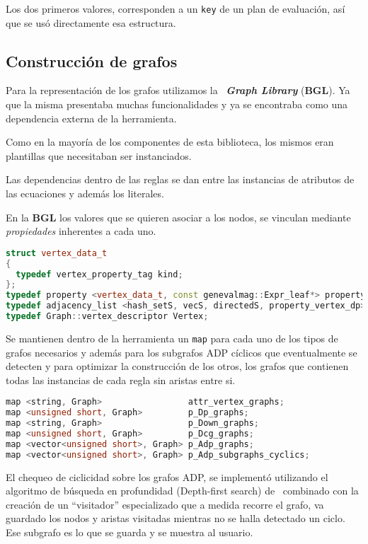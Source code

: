 Los dos primeros valores, corresponden a un \texttt{key} de un plan de evaluación, así que se usó directamente esa estructura.

\subsection{Construcción de grafos}

Para la representación de los grafos utilizamos la \boost\ \textit{\textbf{Graph Library}} (\textbf{BGL}). Ya que la misma presentaba muchas funcionalidades y ya se encontraba como una dependencia externa de la herramienta.

Como en la mayoría de los componentes de esta biblioteca, los mismos eran plantillas que necesitaban ser instanciados.

Las dependencias dentro de las reglas se dan entre las instancias de atributos de las ecuaciones y además los literales.

En la \textbf{BGL} los valores que se quieren asociar a los nodos, se vinculan mediante \textit{propiedades} inherentes a cada uno.

\begin{lstlisting}[language=C++, basicstyle=\scriptsize, columns=fullflexible, linewidth=13cm]
struct vertex_data_t
{
  typedef vertex_property_tag kind;
};
typedef property <vertex_data_t, const genevalmag::Expr_leaf*> property_vertex_dp;
typedef adjacency_list <hash_setS, vecS, directedS, property_vertex_dp> Graph;
typedef Graph::vertex_descriptor Vertex;
\end{lstlisting}

Se mantienen dentro de la herramienta un \texttt{map} para cada uno de los tipos de grafos necesarios y además para los subgrafos ADP cíclicos que eventualmente se detecten y para optimizar la construcción de los otros, los grafos que contienen todas las instancias de cada regla sin aristas entre si.

\begin{lstlisting}[language=C++, basicstyle=\scriptsize, linewidth=11.5cm]
map <string, Graph>                 attr_vertex_graphs;
map <unsigned short, Graph>         p_Dp_graphs;
map <string, Graph>                 p_Down_graphs;
map <unsigned short, Graph>         p_Dcg_graphs;
map <vector<unsigned short>, Graph> p_Adp_graphs;
map <vector<unsigned short>, Graph> p_Adp_subgraphs_cyclics;
\end{lstlisting}

El chequeo de ciclicidad sobre los grafos ADP, se implementó utilizando el algoritmo de búsqueda en profundidad (Depth-first search) de \boost\ combinado con la creación de un ``visitador'' especializado que a medida recorre el grafo, va guardado los nodos y aristas visitadas mientras no se halla detectado un ciclo. Ese subgrafo es lo que se guarda y se muestra al usuario.

